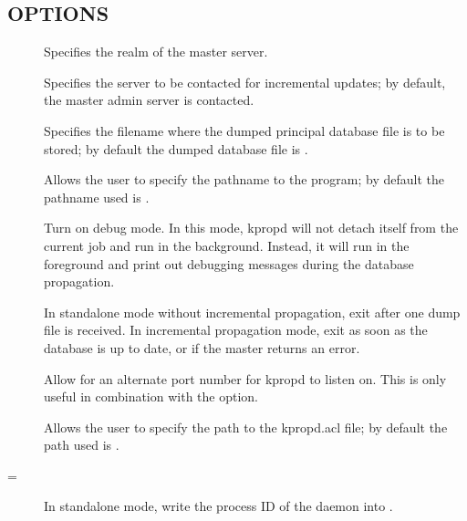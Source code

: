 \documentclass[letterpaper,10pt,english]{sphinxmanual}
\begin{document}
\subsection{OPTIONS}
\label{\detokenize{admin/admin_commands/kpropd:options}}\begin{description}
\item[{ }] \leavevmode
Specifies the realm of the master server.

\item[{ }] \leavevmode
Specifies the server to be contacted for incremental updates; by
default, the master admin server is contacted.

\item[{ }] \leavevmode
Specifies the filename where the dumped principal database file is
to be stored; by default the dumped database file is {\hyperref[\detokenize{mitK5defaults:paths}]{}}.

\item[{}] \leavevmode
Allows the user to specify the pathname to the {\hyperref[\detokenize{admin/admin_commands/kdb5_util:kdb5-util-8}]{}}
program; by default the pathname used is {\hyperref[\detokenize{mitK5defaults:paths}]{}}.

\item[{}] \leavevmode
Turn on debug mode.  In this mode, kpropd will not detach
itself from the current job and run in the background.  Instead,
it will run in the foreground and print out debugging messages
during the database propagation.

\item[{}] \leavevmode
In standalone mode without incremental propagation, exit after one
dump file is received.  In incremental propagation mode, exit as
soon as the database is up to date, or if the master returns an
error.

\item[{}] \leavevmode
Allow for an alternate port number for kpropd to listen on.  This
is only useful in combination with the  option.

\item[{ }] \leavevmode
Allows the user to specify the path to the kpropd.acl file; by
default the path used is {\hyperref[\detokenize{mitK5defaults:paths}]{}}.

\item[{=}] \leavevmode
In standalone mode, write the process ID of the daemon into
.

\end{description}
\end{document}
